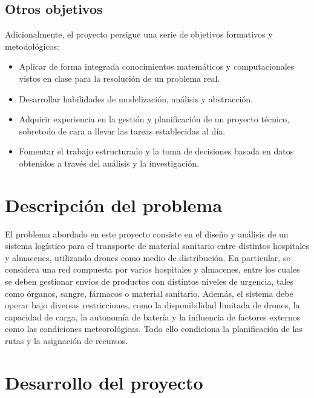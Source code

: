\documentclass[11pt, a4paper]{article} %
\begin{document}
\subsection{Otros objetivos}
Adicionalmente, el proyecto persigue una serie de objetivos formativos y metodológicos:
\begin{itemize}
    \item Aplicar de forma integrada conocimientos matemáticos y computacionales vistos en clase para la resolución de un problema real.
    \item Desarrollar habilidades de modelización, análisis y abstracción.
    \item Adquirir experiencia en la gestión y planificación de un proyecto técnico, sobretodo de cara a llevar las tareas establecidas al día.
    \item Fomentar el trabajo estructurado y la toma de decisiones basada en datos obtenidos a través del análisis y la investigación.
\end{itemize}

\section{Descripción del problema}
El problema abordado en este proyecto consiste en el diseño y análisis de un sistema logístico para el transporte de material sanitario entre distintos hospitales y almacenes, utilizando drones como medio de distribución. En particular, se considera una red compuesta por varios hospitales y almacenes, entre los cuales se deben gestionar envíos de productos con distintos niveles de urgencia, tales como órganos, sangre, fármacos o material sanitario. Además, el sistema debe operar bajo diversas restricciones, como la disponibilidad limitada de drones, la capacidad de carga, la autonomía de batería y la influencia de factores externos como las condiciones meteorológicas. Todo ello condiciona la planificación de las rutas y la asignación de recursos.

\section{Desarrollo del proyecto}
\end{document}
